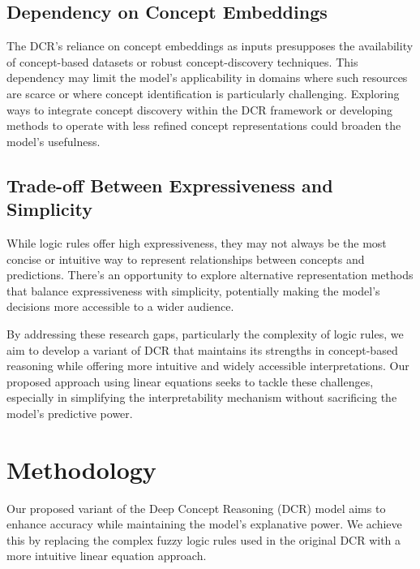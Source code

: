 \documentclass[sigconf, nonacm]{acmart}
\begin{document}
\subsection{Dependency on Concept Embeddings}
\vspace{2pt}
The DCR's reliance on concept embeddings as inputs presupposes the availability of concept-based datasets or robust concept-discovery techniques. This dependency may limit the model's applicability in domains where such resources are scarce or where concept identification is particularly challenging. Exploring ways to integrate concept discovery within the DCR framework or developing methods to operate with less refined concept representations could broaden the model's usefulness. \vspace{6pt}

\subsection{Trade-off Between Expressiveness and Simplicity}
\vspace{2pt}
While logic rules offer high expressiveness, they may not always be the most concise or intuitive way to represent relationships between concepts and predictions. There's an opportunity to explore alternative representation methods that balance expressiveness with simplicity, potentially making the model's decisions more accessible to a wider audience.

By addressing these research gaps, particularly the complexity of logic rules, we aim to develop a variant of DCR that maintains its strengths in concept-based reasoning while offering more intuitive and widely accessible interpretations. Our proposed approach using linear equations seeks to tackle these challenges, especially in simplifying the interpretability mechanism without sacrificing the model's predictive power. \vspace{8pt}

\section{Methodology}
\vspace{2pt}
Our proposed variant of the Deep Concept Reasoning (DCR) model aims to enhance accuracy while maintaining the model's explanative power. We achieve this by replacing the complex fuzzy logic rules used in the original DCR with a more intuitive linear equation approach. \vspace{6pt}
\end{document}
